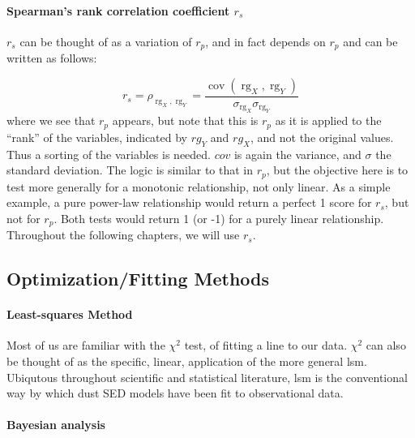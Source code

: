     \paragraph{Spearman's rank correlation coefficient $r_{s}$}
     $r_{s}$ can be thought of as a variation of $r_{p}$, and in fact depends on $r_{p}$ and can be written as follows:

       \begin{equation}
         r_s = \rho_{\operatorname{rg}_X,\operatorname{rg}_Y} = \frac {\operatorname{cov}(\operatorname{rg}_X,\operatorname{rg}_Y)} { \sigma_{\operatorname{rg}_X} \sigma_{\operatorname{rg}_Y} }
       \end{equation}
       where we see that $r_{p}$ appears, but note that this is $r_{p}$ as it is applied to the ``rank'' of the variables, indicated by $rg_{Y}$ and $rg_{X}$, and not the original values. Thus a sorting of the variables is needed. $cov$ is again the variance, and $\sigma{}$ the standard deviation.
       The logic is similar to that in $r_{p}$, but the objective here is to test more generally for a monotonic relationship, not only linear. As a simple example, a pure power-law relationship would return a perfect 1 score for $r_{s}$, but not for $r_{p}$. Both tests would return 1 (or -1) for a purely linear relationship. Throughout the following chapters, we will use $r_{s}$.

       \subsection{Optimization/Fitting Methods}

       \paragraph{Least-squares Method}

       Most of us are familiar with the $\chi{}^{2}$ test, of fitting a line to our data. $\chi{}^{2}$ can also be thought of as the specific, linear, application of the more general \acrlong{lsm}. Ubiqutous throughout scientific and statistical literature, \acrshort{lsm} is the conventional way by which dust SED models have been fit to observational data.

       \paragraph{Bayesian analysis}

